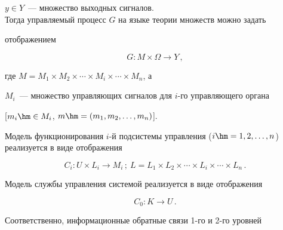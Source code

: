   


  $y\in Y$~--- множество выходных сигналов.\\[-9pt]


  


  Тогда управляемый процесс $G$ на языке теории множеств можно задать 


отображением 


  \begin{equation*}


     G: M \times \Omega \rightarrow Y\,,




     \end{equation*}


где $M = M_1\times M_2\times\cdots \times M_i\times\cdots\times M_n$, а 


$M_i$~--- множество управляющих сигналов для $i$-го управляющего органа 


[$m_i\hm\in M_i$,  $m\hm=(m_1, m_2, \ldots , m_n)$].


  


  Модель функционирования $i$-й подсистемы управления ($i\hm = 1, 2, \ldots 


, n$) реализуется в виде отображения


  \begin{equation*}


     C_i: U \times L_i \rightarrow  M_i\,;\ L= L_1 \times L_2 \times \cdots \times  L_i 


\times \cdots \times L_n\,.




     \end{equation*}


     


     Модель службы управления системой реализуется в виде отображения


     \begin{equation*}


     C_0: K \rightarrow U\,.




     \end{equation*}


     


     Соответственно, информационные обратные связи 1-го и 2-го уровней 


